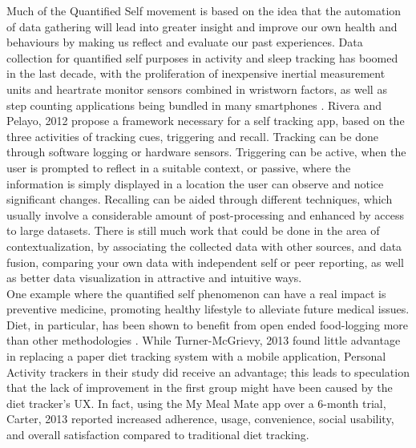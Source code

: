 Much of the Quantified Self movement is based on the idea that the automation of data gathering will lead into greater insight and improve our own health and behaviours by making us reflect and evaluate our past experiences. Data collection for quantified self purposes in activity and sleep tracking has boomed in the last decade, with the proliferation of inexpensive inertial measurement units and heartrate monitor sensors combined in wristworn factors, as well as step counting applications being bundled in many smartphones \cite{Crawford2015}.
Rivera and Pelayo, 2012 \cite{Rivera-Pelayo2012} propose a framework necessary for a self tracking app, based on the three activities of tracking cues, triggering and recall.
Tracking can be done through software logging or hardware sensors. Triggering can be active, when the user is prompted to reflect in a suitable context, or passive, where the information is simply displayed in a location the user can observe and notice significant changes. Recalling can be aided through different techniques, which usually involve a considerable amount of post-processing and enhanced by access to large datasets. There is still much work that could be done in the area of contextualization, by associating the collected data with other sources, and data fusion, comparing your own data with independent self or peer reporting, as well as better data visualization in attractive and intuitive ways. \\
One example where the quantified self phenomenon can have a real impact is preventive medicine, promoting healthy lifestyle to alleviate future medical issues. Diet, in particular, has been shown to benefit from open ended food-logging more than other methodologies \cite{Bingham1994}. While Turner-McGrievy, 2013 \cite{Turner-McGrievy2013} found little advantage in replacing a paper diet tracking system with a mobile application, Personal Activity trackers in their study did receive an advantage; this leads to speculation that the lack of improvement in the first group might have been caused by the diet tracker's UX. In fact, using the My Meal Mate app over a 6-month trial, Carter, 2013 \cite{carter2013adherence} reported increased adherence, usage, convenience, social usability, and overall satisfaction compared to traditional diet tracking. \\
